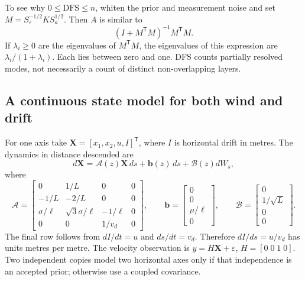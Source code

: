 To see why $0\leq\mathrm{DFS}\leq n$, whiten the prior and measurement noise and set $M=S_\varepsilon^{-1/2}KS_a^{1/2}$. Then $A$ is similar to
\begin{equation}
 (I+M^{\mathsf T}M)^{-1}M^{\mathsf T}M.
\end{equation}
If $\lambda_i\geq0$ are the eigenvalues of $M^{\mathsf T}M$, the eigenvalues of this expression are $\lambda_i/(1+\lambda_i)$. Each lies between zero and one. DFS counts partially resolved modes, not necessarily a count of distinct non-overlapping layers.

\subsection{A continuous state model for both wind and drift}
For one axis take $\mathbf X=[x_1,x_2,u,I]^{\mathsf T}$, where $I$ is horizontal drift in metres. The dynamics in distance descended are
\begin{equation}
 d\mathbf X=\mathcal A(z)\mathbf X\,ds+\mathbf b(z)\,ds+\mathcal B(z)dW_s,
\end{equation}
where
\begin{equation}
 \mathcal A=\begin{bmatrix}
 0&1/L&0&0\\
 -1/L&-2/L&0&0\\
 \sigma/\ell&\sqrt3\sigma/\ell&-1/\ell&0\\
 0&0&1/v_d&0
 \end{bmatrix},\qquad
 \mathbf b=\begin{bmatrix}0\\0\\\mu/\ell\\0\end{bmatrix},\qquad
 \mathcal B=\begin{bmatrix}0\\1/\sqrt L\\0\\0\end{bmatrix}.
\end{equation}
The final row follows from $dI/dt=u$ and $ds/dt=v_d$. Therefore $dI/ds=u/v_d$ has units metres per metre. The velocity observation is $y=H\mathbf X+\varepsilon$, $H=[0\;0\;1\;0]$. Two independent copies model two horizontal axes only if that independence is an accepted prior; otherwise use a coupled covariance.

